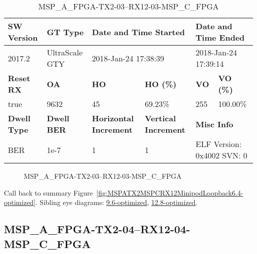\begin{table}[h]
\centering
\caption{MSP\_A\_FPGA-TX2-03--RX12-03-MSP\_C\_FPGA}
\label{tab:MSPAFPGATX203RX1203MSPCFPGA6.4-optimized}
\begin{tabular}{@{}|l|l|l|l|l|l|@{}}
\toprule
\textbf{SW Version}                & \textbf{GT Type}   & \multicolumn{2}{l|}{\textbf{Date and Time Started}}            & \multicolumn{2}{l|}{\textbf{Date and Time Ended}}        \\ \midrule
2017.2                       & UltraScale GTY          & \multicolumn{2}{l|}{2018-Jan-24 17:38:39}                   & \multicolumn{2}{l|}{2018-Jan-24 17:39:14}               \\ \midrule
\textbf{Reset RX}                  & \textbf{OA} & \textbf{HO}   & \textbf{HO (\%)} & \textbf{VO} & \textbf{VO (\%)} \\ \midrule
true & 9632        & 45          & 69.23\%        & 255        & 100.00\%       \\ \midrule
\textbf{Dwell Type}                & \textbf{Dwell BER} & \textbf{Horizontal Increment} & \textbf{Vertical Increment}    & \multicolumn{2}{l|}{\textbf{Misc Info}}                  \\ \midrule
BER                            & 1e-7        & 1        & 1           & \multicolumn{2}{l|}{ELF Version: 0x4002 SVN: 0}                         \\ \bottomrule
\end{tabular}
\end{table}

\begin{figure}[h]
\caption{MSP\_A\_FPGA-TX2-03--RX12-03-MSP\_C\_FPGA} \label{fig:MSPAFPGATX203RX1203MSPCFPGA6.4-optimized}
\end{figure}

Call back to summary Figure~\ref{fig:MSPATX2MSPCRX12MinipodLoopback6.4-optimized}.
Sibling eye diagrams: \hyperref[sec:MSPAFPGATX203RX1203MSPCFPGA9.6-optimized]{9.6-optimized}, \hyperref[sec:MSPAFPGATX203RX1203MSPCFPGA12.8-optimized]{12.8-optimized}.

\clearpage
\newpage


\subsection{MSP\_A\_FPGA-TX2-04--RX12-04-MSP\_C\_FPGA}\label{sec:MSPAFPGATX204RX1204MSPCFPGA6.4-optimized}

